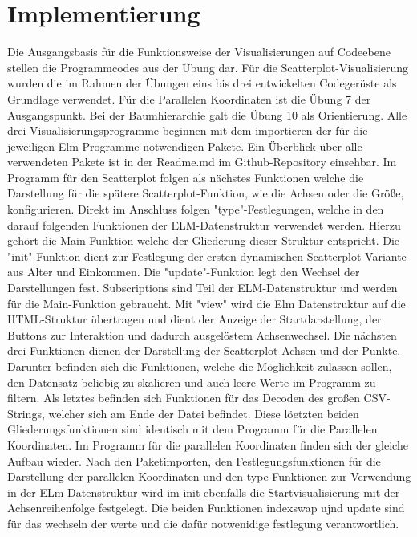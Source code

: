 \documentclass[usegeometry=true]{scrartcl}
\begin{document}
\section{Implementierung}
Die Ausgangsbasis für die Funktionsweise der Visualisierungen auf Codeebene  stellen die Programmcodes aus der Übung dar. Für die Scatterplot-Visualisierung wurden die im Rahmen der Übungen eins bis drei entwickelten Codegerüste als Grundlage verwendet. Für die Parallelen Koordinaten ist die Übung 7 der Ausgangspunkt. Bei der Baumhierarchie galt die Übung 10 als Orientierung. 
Alle drei Visualisierungsprogramme beginnen mit dem importieren der für die jeweiligen Elm-Programme notwendigen Pakete. Ein Überblick über alle verwendeten Pakete ist in der Readme.md im Github-Repository einsehbar. 
Im Programm für den Scatterplot folgen als nächstes Funktionen welche die Darstellung für die spätere Scatterplot-Funktion, wie die Achsen oder die Größe, konfigurieren. Direkt im Anschluss folgen "type"-Festlegungen, welche in den darauf folgenden Funktionen der ELM-Datenstruktur verwendet werden. Hierzu gehört die Main-Funktion welche der Gliederung dieser Struktur entspricht. Die "init"-Funktion dient zur Festlegung der ersten dynamischen Scatterplot-Variante aus Alter und Einkommen. Die "update"-Funktion legt den Wechsel der Darstellungen fest. Subscriptions sind Teil der ELM-Datenstruktur und werden für die Main-Funktion gebraucht. Mit "view" wird die Elm Datenstruktur auf die HTML-Struktur übertragen und dient der Anzeige der Startdarstellung, der Buttons zur Interaktion und dadurch ausgelöstem Achsenwechsel. Die nächsten drei Funktionen dienen der Darstellung der Scatterplot-Achsen und der Punkte.
Darunter befinden sich die Funktionen, welche die Möglichkeit zulassen sollen, den Datensatz beliebig zu skalieren und auch leere Werte im Programm zu filtern. Als letztes befinden sich Funktionen für das Decoden des großen CSV-Strings, welcher sich am Ende der Datei befindet. Diese löetzten beiden Gliederungsfunktionen sind identisch mit dem Programm für die Parallelen Koordinaten. 
Im Programm für die parallelen Koordinaten finden sich der gleiche Aufbau wieder. Nach den Paketimporten, den Festlegungsfunktionen für die Darstellung der parallelen Koordinaten und den type-Funktionen zur Verwendung in der ELm-Datenstruktur wird im init ebenfalls die Startvisualisierung mit der Achsenreihenfolge festgelegt. Die beiden Funktionen indexswap ujnd update sind für das wechseln der werte und die dafür notwenidige festlegung verantwortlich. 
\end{document}
